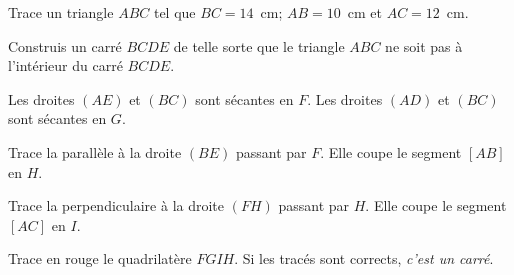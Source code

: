 \begin{myenumerate}
\item Trace un triangle $ABC$ tel que $BC=14$~cm; $AB=10$~cm et
$AC=12$~cm.
\item Construis un carré $BCDE$ de telle sorte que le triangle $ABC$
ne soit pas à l'intérieur du carré $BCDE$.
\item Les droites $(AE)$ et $(BC)$ sont sécantes en $F$. Les droites
$(AD)$ et $(BC)$ sont sécantes en $G$.
\item Trace la parallèle à la droite $(BE)$ passant par $F$. Elle
coupe le segment $[AB]$ en $H$.
\item Trace la perpendiculaire à la droite $(FH)$ passant par
$H$. Elle coupe le segment $[AC]$ en $I$.
\item Trace en rouge le quadrilatère $FGIH$. Si les tracés sont
corrects, {\em c'est un carré}.
\end{myenumerate}